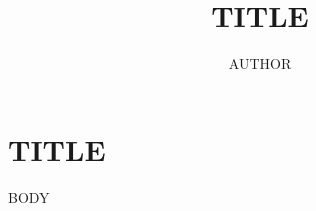 \documentclass[aspectratio=169,UTF8,11pt,fontset=none]{ctexbeamer}
\title{ {{TITLE}} }
\author{ {{AUTHOR}} }
\date{}
\begin{document}
\begin{frame}\titlepage\end{frame}
\section[A]{ {{TITLE}} }
{{BODY}}
\end{document}
